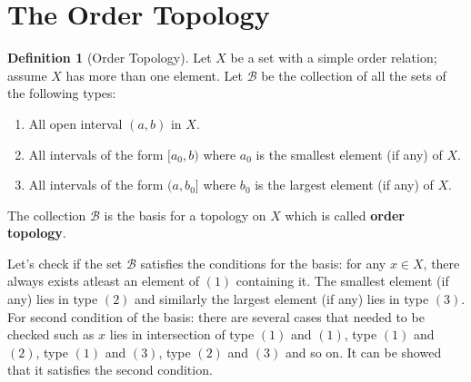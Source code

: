 \documentclass[12pt,reqno]{amsart}
\theoremstyle{plain}
\theoremstyle{definition}
\newtheorem{defn}{Definition}
\newcommand{\cal}[1]{\mathcal{#1}}
\begin{document}
\section{The Order Topology}
\begin{defn}[Order Topology]
    Let $X$ be a set with a simple order relation; assume $X$ has more than one element. Let $\cal B$ be the collection of all the sets of the following types:
    \begin{enumerate}
        \item All open interval $(a,b)$ in $X$.
        \item All intervals of the form $[a_0, b)$ where $a_0$ is the smallest element (if any) of $X$.
        \item All intervals of the form $(a, b_0]$ where $b_0$ is the largest element (if any) of $X$.
    \end{enumerate}
    The collection $\cal B$ is the basis for a topology on $X$ which is called {\bf order topology}.
\end{defn}
Let's check if the set $\cal B$ satisfies the conditions for the basis: for any $x \in X$, there always exists atleast an element of $(1)$ containing it. The smallest element (if any) lies in type $(2)$ and similarly the largest element (if any) lies in type $(3)$. For second condition of the basis: there are several cases that needed to be checked such as $x$ lies in intersection of type $(1)$ and $(1)$, type $(1)$ and $(2)$, type $(1)$ and $(3)$, type $(2)$ and $(3)$ and so on. It can be showed that it satisfies the second condition.
\end{document}
